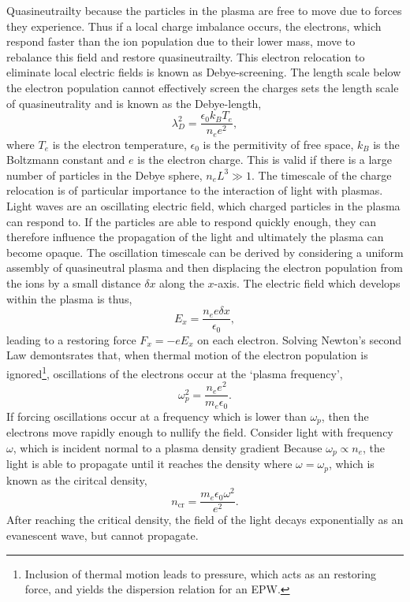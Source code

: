 Quasineutrailty because the particles in the plasma are free to move due to forces they experience.
Thus if a local charge imbalance occurs, the electrons, which respond faster than the ion population due to their lower mass, move to rebalance this field and restore quasineutrailty.
This electron relocation to eliminate local electric fields is known as Debye-screening.
The length scale below the electron population cannot effectively screen the charges sets the length scale of quasineutrality and is known as the Debye-length,
\begin{equation}
    \lambda_{D}^2 = \frac{\epsilon_0 k_B T_e}{n_e e^2},
\end{equation}
where $T_e$ is the electron temperature, $\epsilon_0$ is the permitivity of free space, $k_B$ is the Boltzmann constant and $e$ is the electron charge.
This is valid if there is a large number of particles in the Debye sphere, $n_e L^3\gg 1$.
The timescale of the charge relocation is of particular importance to the interaction of light with plasmas.
Light waves are an oscillating electric field, which charged particles in the plasma can respond to.
If the particles are able to respond quickly enough, they can therefore influence the propagation of the light and ultimately the plasma can become opaque.
The oscillation timescale can be derived by considering a uniform assembly of quasineutral plasma and then displacing the electron population from the ions by a small distance $\delta x$ along the $x$-axis.
The electric field which develops within the plasma is thus,
\begin{equation}
    E_x = \frac{n_e e \delta x}{\epsilon_0},
\end{equation}
leading to a restoring force $F_x = -eE_x$ on each electron.
Solving Newton's second Law demontsrates that, when thermal motion of the electron population is ignored\footnote{Inclusion of thermal motion leads to pressure, which acts as an restoring force, and yields the dispersion relation for an \ac{EPW}.}, oscillations of the electrons occur at the `plasma frequency',
\begin{equation}
    \label{eq:theory_plasma_freq}
    \omega_{p}^2 = \frac{n_e e^2}{m_e \epsilon_0}.
\end{equation}
If forcing oscillations occur at a frequency which is lower than $\omega_p$, then the electrons move rapidly enough to nullify the field.
Consider light with frequency $\omega$, which is incident normal to a plasma density gradient
Because $\omega_p\propto n_e$, the light is able to propagate until it reaches the density where $\omega = \omega_p$, which is known as the ciritcal density,
\begin{equation}
    \label{eq:theory_critical_density}
    n_{\text{cr}} = \frac{m_e \epsilon_0 \omega^2}{e^2}.
\end{equation}
After reaching the critical density, the field of the light decays exponentially as an evanescent wave, but cannot propagate.


